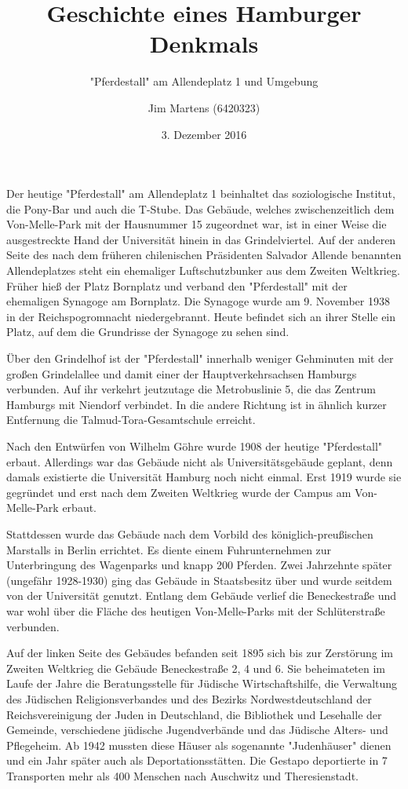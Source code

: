 \documentclass[10pt,a4paper,oneside,ngerman,numbers=noenddot]{scrartcl}
\begin{document}
\author{Jim Martens (6420323)}
\title{Geschichte eines Hamburger Denkmals}
\subtitle{"Pferdestall" am Allendeplatz 1 und Umgebung}
\date{3. Dezember 2016}
\maketitle

Der heutige "Pferdestall" am Allendeplatz 1 beinhaltet das soziologische Institut,
die Pony-Bar und auch die T-Stube. Das Gebäude, welches zwischenzeitlich dem
Von-Melle-Park mit der Hausnummer 15 zugeordnet war, ist in einer Weise die
ausgestreckte Hand der Universität hinein in das Grindelviertel. Auf der anderen
Seite des nach dem früheren chilenischen Präsidenten Salvador Allende benannten
Allendeplatzes steht ein ehemaliger Luftschutzbunker aus dem Zweiten Weltkrieg.
Früher hieß der Platz Bornplatz und verband den "Pferdestall" mit der ehemaligen
Synagoge am Bornplatz. Die Synagoge wurde am 9. November 1938 in der Reichspogromnacht
niedergebrannt. Heute befindet sich an ihrer Stelle ein Platz, auf dem die Grundrisse
der Synagoge zu sehen sind.

Über den Grindelhof ist der "Pferdestall" innerhalb weniger Gehminuten mit der
großen Grindelallee und damit einer der Hauptverkehrsachsen Hamburgs verbunden.
Auf ihr verkehrt jeutzutage die Metrobuslinie 5, die das Zentrum Hamburgs mit
Niendorf verbindet.
In die andere Richtung ist in ähnlich kurzer Entfernung die Talmud-Tora-Gesamtschule
erreicht.

Nach den Entwürfen von Wilhelm Göhre wurde 1908 der heutige "Pferdestall" erbaut.
Allerdings war das Gebäude nicht als Universitätsgebäude geplant, denn damals
existierte die Universität Hamburg noch nicht einmal. Erst 1919 wurde sie gegründet
und erst nach dem Zweiten Weltkrieg wurde der Campus am Von-Melle-Park erbaut.

Stattdessen wurde das Gebäude nach dem Vorbild des königlich-preußischen Marstalls
in Berlin errichtet. Es diente einem Fuhrunternehmen zur Unterbringung des
Wagenparks und knapp 200 Pferden. Zwei Jahrzehnte später (ungefähr 1928-1930)
ging das Gebäude in Staatsbesitz über und wurde seitdem von der Universität genutzt.
Entlang dem Gebäude verlief die Beneckestraße und war wohl über die Fläche des
heutigen Von-Melle-Parks mit der Schlüterstraße verbunden.

Auf der linken Seite des Gebäudes befanden seit 1895 sich bis zur Zerstörung im
Zweiten Weltkrieg die Gebäude Beneckestraße 2, 4 und 6. Sie beheimateten im Laufe
der Jahre die Beratungsstelle für Jüdische Wirtschaftshilfe, die Verwaltung des
Jüdischen Religionsverbandes und des Bezirks Nordwestdeutschland der Reichsvereinigung
der Juden in Deutschland, die Bibliothek und Lesehalle der Gemeinde, verschiedene
jüdische Jugendverbände und das Jüdische Alters- und Pflegeheim. Ab 1942 mussten
diese Häuser als sogenannte "Judenhäuser" dienen und ein Jahr später auch als
Deportationsstätten. Die Gestapo deportierte in 7 Transporten mehr als 400 Menschen
nach Auschwitz und Theresienstadt.
\end{document}
